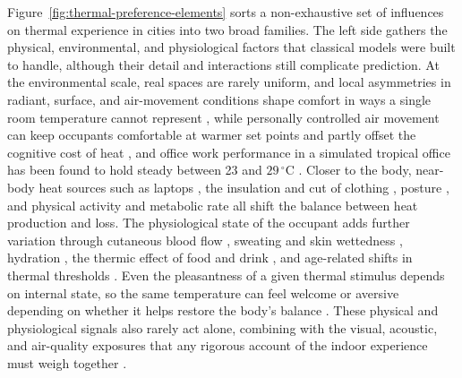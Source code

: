 \documentclass[final,5p,times,twocolumn]{elsarticle}
\begin{document}
Figure~\ref{fig:thermal-preference-elements} sorts a non-exhaustive set of influences on thermal experience in cities into two broad families.
The left side gathers the physical, environmental, and physiological factors that classical models were built to handle, although their detail and interactions still complicate prediction.
At the environmental scale, real spaces are rarely uniform, and local asymmetries in radiant, surface, and air-movement conditions shape comfort in ways a single room temperature cannot represent \citep{Su2023-tg}, while personally controlled air movement can keep occupants comfortable at warmer set points and partly offset the cognitive cost of heat \citep{Schiavon2017-fx}, and office work performance in a simulated tropical office has been found to hold steady between 23 and $29\,^{\circ}$C \citep{Porras-Salazar2024-mo}.
Closer to the body, near-body heat sources such as laptops \citep{Zhang2014-im}, the insulation and cut of clothing \citep{Havenith2015-yn}, posture \citep{Tikuisis1996-fd}, and physical activity and metabolic rate \citep{Gaesser1975-jn} all shift the balance between heat production and loss.
The physiological state of the occupant adds further variation through cutaneous blood flow \citep{Johnson2010-eh}, sweating and skin wettedness \citep{Fukazawa2009-nx}, hydration \citep{Sawka2001-sz}, the thermic effect of food and drink \citep{Swaminathan1985-ca, Otsuka2021-ty}, and age-related shifts in thermal thresholds \citep{Huang2010-hy}.
Even the pleasantness of a given thermal stimulus depends on internal state, so the same temperature can feel welcome or aversive depending on whether it helps restore the body's balance \citep{Cabanac1971-mg}.
These physical and physiological signals also rarely act alone, combining with the visual, acoustic, and air-quality exposures that any rigorous account of the indoor experience must weigh together \citep{Chinazzo2022-dt}.
\end{document}
